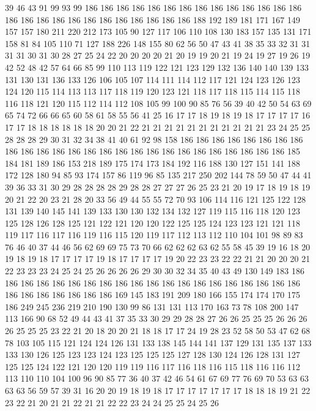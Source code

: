 39 46 43 91 99 93 99 186 186 186 186 186 186 186 186 186 186 186 186 186
186 186 186 186 186 186 186 186 186 186 186 186 186 188 192 189 181 171 167 149
157 157 180 211 220 212 173 105 90 127 117 106 110 108 130 183 157 135 131 171
158 81 84 105 110 71 127 188 226 148 155 80 62 56 50 47 43 41 38 35
33 32 31 31 31 31 30 31 30 28 27 25 24 22 20 20 20 20 21 20
19 19 20 21 19 24 19 27 19 26 19 42 52 48 42 57 64 66 85 99
110 113 119 122 121 123 129 132 136 140 140 139 133 131 130 131 136 133 126 106
105 107 114 111 114 112 117 121 124 123 126 123 124 120 115 114 113 113 117 118
119 120 123 121 118 117 118 115 114 115 118 116 118 121 120 115 112 114 112 108
105 99 100 90 85 76 56 39 40 42 50 54 63 69 65 74 72 66 66 65
60 58 61 58 55 56 41 25 16 17 17 18 19 18 19 18 17 17 17 17
16 17 17 18 18 18 18 18 18 20 20 21 22 21 21 21 21 21 21 21
21 21 21 21 23 24 25 25 28 28 28 29 30 31 32 34 38 41 40 61
92 98 158 186 186 186 186 186 186 186 186 186 186 186 186 186 186 186 186 186
186 186 186 186 186 186 186 186 186 185 184 181 189 186 153 218 189 175 174 173
184 192 116 188 130 127 151 141 188 172 128 180 94 85 93 174 157 86 119 96
85 135 217 250 202 144 78 59 50 47 44 41 39 36 33 31 30 29 28 28
28 28 29 28 28 27 27 27 26 25 23 21 20 19 17 18 19 18 19 20
21 22 20 23 21 28 20 33 56 49 44 55 55 72 70 93 106 114 116 121
125 122 128 131 139 140 145 141 139 133 130 130 132 134 132 127 119 115 116 118
120 123 125 128 126 128 125 121 122 121 120 120 122 125 125 124 123 123 121 121
118 119 117 116 117 116 119 116 115 120 119 117 112 113 112 110 104 101 98 89
83 76 46 40 37 44 46 56 62 69 69 75 73 70 66 62 62 62 63 62
55 58 45 39 19 16 18 20 19 18 19 18 17 17 17 17 19 18 17 17
17 17 19 20 22 23 23 22 22 21 21 20 20 20 21 22 23 23 23 24
25 24 25 26 26 26 26 29 30 30 32 34 35 40 43 49 130 149 183 186
186 186 186 186 186 186 186 186 186 186 186 186 186 186 186 186 186 186 186 186
186 186 186 186 186 186 169 145 183 191 209 180 166 155 174 174 170 175 186 249
245 236 219 210 190 130 99 86 131 131 113 170 163 73 78 108 200 147 113 166
90 68 52 49 44 43 41 37 35 33 30 29 29 28 28 27 26 26 25 25
25 26 26 26 26 25 25 25 23 22 21 20 18 20 20 21 18 18 17 17
24 19 28 23 52 58 50 53 47 62 68 78 103 105 115 121 124 124 126 131
133 138 145 144 141 137 129 131 135 137 133 133 130 126 125 123 123 124 123 125
125 125 127 128 130 124 126 128 131 127 125 125 124 122 121 120 120 119 119 116
117 116 118 116 115 118 116 116 112 113 110 110 104 100 96 90 85 77 36 40
37 42 46 54 61 67 69 77 76 69 70 53 63 63 63 63 56 59 57 39
31 16 20 20 19 18 19 18 17 17 17 17 17 17 17 18 18 18 19 21
22 23 22 21 20 21 21 22 21 21 22 22 23 24 24 25 25 24 25 26
